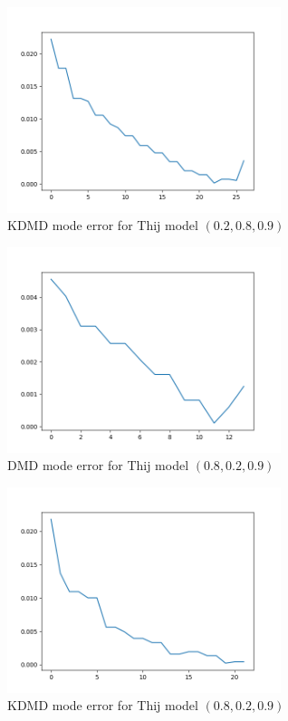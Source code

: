 \begin{figure}
    \includegraphics[width=8cm]{Images/mode_error_kdmd_twitter_020809.png}
    \centering
    \caption{KDMD mode error for Thij model $(0.2,0.8,0.9)$}
\end{figure}


\begin{figure}
    \includegraphics[width=8cm]{Images/mode_error_dmd_twitter_080209.png}
    \centering
    \caption{DMD mode error for Thij model $(0.8,0.2,0.9)$}
\end{figure}


\begin{figure}
    \includegraphics[width=8cm]{Images/mode_error_kdmd_twitter_080209.png}
    \centering
    \caption{KDMD mode error for Thij model $(0.8,0.2,0.9)$}
\end{figure}


